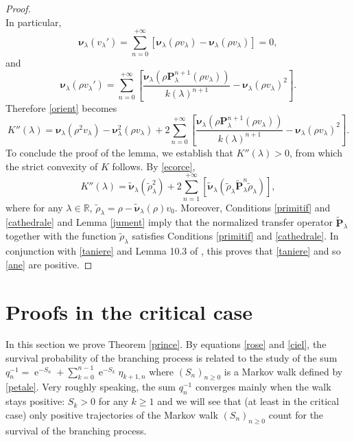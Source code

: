 \documentclass[12pt]{amsart}
\theoremstyle{definition}
\numberwithin{equation}{section}
\def\bb#1{\mathbb{#1}}
\def\bs#1{\boldsymbol{#1}}
\def\bf#1{\mathbf{#1}}
\def\tt#1{\tilde{#1}}
\def\tbf#1{\tilde{\mathbf{#1}}}
\def\tbs#1{\tilde{\boldsymbol{#1}}}
\def\geq{\geqslant}
\renewcommand\ll{\lambda}
\DeclareMathOperator{\e}{e}
\begin{document}
\begin{proof}
\[\]
In particular,
\[
\bs \nu_{\ll} \left( v_{\ll}' \right) = \sum_{n=0}^{+\infty} \left[ \bs \nu_{\ll} \left( \rho v_{\ll} \right) - \bs \nu_{\ll} \left( \rho v_{\ll} \right) \right] = 0,
\]
and
\[
\bs \nu_{\ll} \left( \rho v_{\ll}' \right) = \sum_{n=0}^{+\infty} \left[ \frac{\bs \nu_{\ll} \left( \rho \bf P_{\ll}^{n+1} \left( \rho v_{\ll} \right) \right)}{k(\ll)^{n+1}} - \bs \nu_{\ll} \left( \rho v_{\ll} \right)^2 \right].
\]
Therefore \eqref{orient} becomes
\[
K''(\ll) = \bs \nu_{\ll} \left( \rho^2 v_{\ll} \right) - \bs \nu_{\ll}^2 \left( \rho v_{\ll} \right) + 2 \sum_{n=0}^{+\infty} \left[ \frac{\bs \nu_{\ll} \left( \rho \bf P_{\ll}^{n+1} \left( \rho v_{\ll} \right) \right)}{k(\ll)^{n+1}} - \bs \nu_{\ll} \left( \rho v_{\ll} \right)^2 \right].
\]
To conclude the proof of the lemma, we establish that $K''(\ll) > 0$, 
from which the strict convexity of $K$ follows.
By \eqref{ecorce},
\begin{equation}
	\label{taniere}
	K''(\ll) =  \tbs \nu_{\ll} \left( \tt \rho_{\ll}^2 \right) + 2 \sum_{n=1}^{+\infty} \left[ \tbs \nu_{\ll} \left( \tt \rho_{\ll} \tbf P_{\ll}^n \tt \rho_{\ll} \right) \right],
\end{equation}
where for any $\ll \in \bb R$, $\tt \rho_{\ll} = \rho - \tbs \nu_{\ll}(\rho) v_0$.
Moreover, Conditions \ref{primitif} and \ref{cathedrale} and Lemma \ref{jument} imply that the normalized transfer operator $\tbf P_{\ll}$ together with the function $\tt \rho_{\ll}$ satisfies Conditions \ref{primitif} and \ref{cathedrale}. In conjunction with \eqref{taniere} and Lemma 10.3 of \cite{GLLP_CLLT_2017}, this proves that \eqref{taniere} and so \eqref{ane} are positive.
\end{proof}



\section{Proofs in the critical case} \label{critcase}

In this section we prove Theorem \ref{prince}. By equations \eqref{rose} and \eqref{ciel}, the survival probability of the branching process is related to the study of the sum $q_{n}^{-1}=\e^{-S_n} + \sum_{k=0}^{n-1} \e^{-S_k}\eta_{k+1,n}$ where $(S_n)_{n\geq 0}$ is a Markov walk defined by \eqref{petale}. 
Very roughly speaking, the sum $q_n^{-1}$ converges mainly when the walk stays positive: $S_k >0$ for any $k \geq 1$ and we will see that (at least in the critical case) only positive trajectories of the Markov walk $(S_n)_{n\geq 0}$ count for the survival of the branching process.
\end{document}
